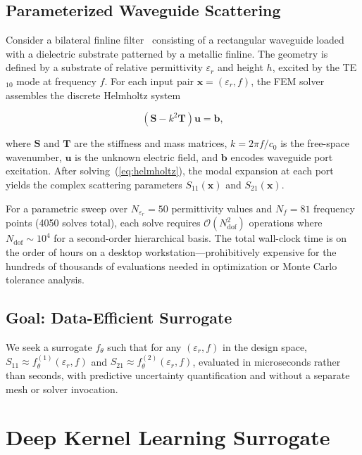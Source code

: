 \documentclass[conference]{IEEEtran}
\begin{document}
\subsection{Parameterized Waveguide Scattering}

Consider a bilateral finline filter~\cite{bornemann2010waveguide} consisting of a rectangular waveguide loaded with a dielectric substrate patterned by a metallic finline. The geometry is defined by a substrate of relative permittivity $\varepsilon_r$ and height $h$, excited by the TE$_{10}$ mode at frequency $f$. For each input pair $\mathbf{x} = (\varepsilon_r, f)$, the FEM solver~\cite{jin2015finite} assembles the discrete Helmholtz system

\begin{equation}\label{eq:helmholtz}
\left( \mathbf{S} - k^2 \mathbf{T} \right) \mathbf{u} = \mathbf{b},
\end{equation}

where $\mathbf{S}$ and $\mathbf{T}$ are the stiffness and mass matrices, $k = 2\pi f / c_0$ is the free-space wavenumber, $\mathbf{u}$ is the unknown electric field, and $\mathbf{b}$ encodes waveguide port excitation. After solving~(\ref{eq:helmholtz}), the modal expansion at each port yields the complex scattering parameters $S_{11}(\mathbf{x})$ and $S_{21}(\mathbf{x})$.

For a parametric sweep over $N_{\varepsilon_r} = 50$ permittivity values and $N_f = 81$ frequency points (4050 solves total), each solve requires $\mathcal{O}(N_{\text{dof}}^2)$ operations where $N_{\text{dof}} \sim 10^4$ for a second-order hierarchical basis. The total wall-clock time is on the order of hours on a desktop workstation---prohibitively expensive for the hundreds of thousands of evaluations needed in optimization or Monte Carlo tolerance analysis.

\subsection{Goal: Data-Efficient Surrogate}

We seek a surrogate $f_\theta$ such that for any $(\varepsilon_r, f)$ in the design space,
$S_{11} \approx f_\theta^{(1)}(\varepsilon_r, f)$ and $S_{21} \approx f_\theta^{(2)}(\varepsilon_r, f)$,
evaluated in microseconds rather than seconds, with predictive uncertainty quantification and without a separate mesh or solver invocation.

\section{Deep Kernel Learning Surrogate}
\end{document}
